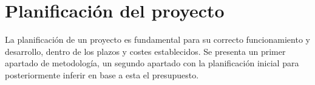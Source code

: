 \chapter{Planificación del proyecto}\label{chap:planif}
La planificación de un proyecto es fundamental para su correcto funcionamiento y
desarrollo, dentro de los plazos y costes establecidos. Se presenta un primer
apartado de metodología, un segundo apartado con la planificación inicial para
posteriormente inferir en base a esta el presupuesto.



\newpage{}


\newpage{}

